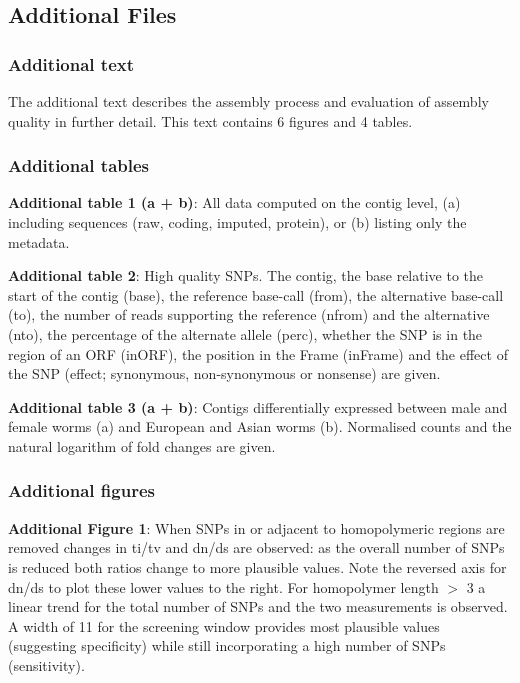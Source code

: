 \documentclass[10pt]{bmc_article}
\newenvironment{bmcformat}{\begin{raggedright}\baselineskip20pt\sloppy\setboolean{publ}{false}}{\end{raggedright}\baselineskip20pt\sloppy}
\begin{document}
\begin{bmcformat}

\subsection*{Additional Files}

\subsubsection*{Additional text}
The additional text describes the assembly process and evaluation of
assembly quality in further detail. This text contains 6 figures and 4
tables.

\subsubsection*{Additional tables}

\textbf{Additional table 1 (a + b)}: All data computed on the contig
level, (a) including sequences (raw, coding, imputed, protein), or (b)
listing only the metadata.

\textbf{Additional table 2}: High quality SNPs. The contig, the base relative
to the start of the contig (base), the reference base-call (from), the
alternative base-call (to), the number of reads supporting the
reference (nfrom) and the alternative (nto), the percentage of the
alternate allele (perc), whether the SNP is in the region of an ORF
(inORF), the position in the Frame (inFrame) and the effect of the SNP
(effect; synonymous, non-synonymous or nonsense) are given.

\textbf{Additional table 3 (a + b)}: Contigs differentially expressed between
male and female worms (a) and European and Asian worms (b). Normalised
counts and the natural logarithm of fold changes are given.

\subsubsection*{Additional figures}

\textbf{Additional Figure 1}: When SNPs in or adjacent to homopolymeric regions
are removed changes in ti/tv and dn/ds are observed: as the overall
number of SNPs is reduced both ratios change to more plausible
values. Note the reversed axis for dn/ds to plot these lower values to
the right. For homopolymer length $>$ 3 a linear trend for the total
number of SNPs and the two measurements is observed. A width of 11 for
the screening window provides most plausible values (suggesting
specificity) while still incorporating a high number of SNPs
(sensitivity).


\end{bmcformat}
\end{document}
